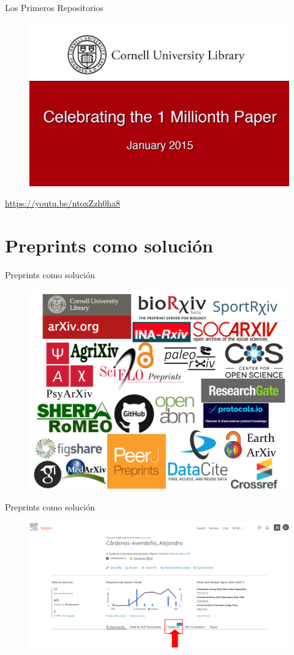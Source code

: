 \documentclass{beamer}
\begin{document}
\begin{frame}{Los Primeros Repositorios}
\centering
\begin{figure}
 \includegraphics[width=.7\textwidth]{arxivyoutube.png}
\end{figure}
\url{https://youtu.be/ntoxZzh0ha8}
\end{frame}


\section{Preprints como solución}
\begin{frame}{Preprints como solución}
\begin{figure}
\centering
 \includegraphics[width=.75\textwidth]{Arxivs}
\end{figure}
\end{frame}

\begin{frame}{Preprints como solución}
\begin{figure}
\centering
 \includegraphics[width=1.1\textwidth]{PreprintScopus.png}
\end{figure}
\end{frame}
\end{document}
